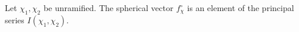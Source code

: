 Let $\chi_1,\chi_2$ be unramified. The spherical vector $f^\circ_\chi$ is an element of the principal series $I(\chi_1,\chi_2)$.
